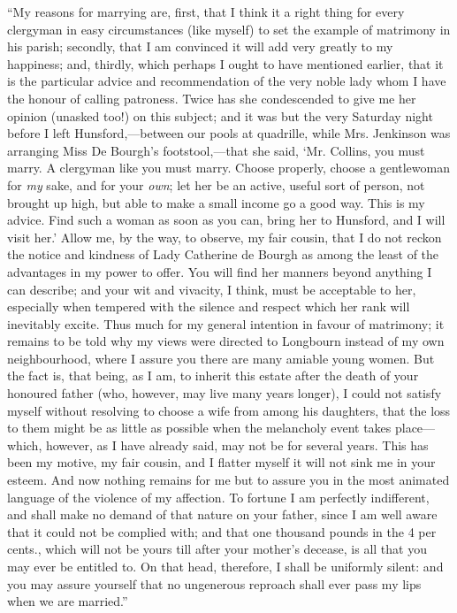 \documentclass[12pt,openright]{book}
\begin{document}
“My reasons for marrying are, first, that I think it a right thing for every clergyman in easy circumstances (like myself) to set the example of matrimony in his parish; secondly, that I am convinced it will add very greatly to my happiness; and, thirdly, which perhaps I ought to have mentioned earlier, that it is the particular advice and recommendation of the very noble lady whom I have the honour of calling patroness. Twice has she condescended to give me her opinion (unasked too!) on this subject; and it was but the very Saturday night before I left Hunsford,—between our pools at quadrille, while Mrs. Jenkinson was arranging Miss De Bourgh’s footstool,—that she said, ‘Mr. Collins, you must marry. A clergyman like you must marry. Choose properly, choose a gentlewoman for \textit{my} sake, and for your \textit{own}; let her be an active, useful sort of person, not brought up high, but able to make a small income go a good way. This is my advice. Find such a woman as soon as you can, bring her to Hunsford, and I will visit her.’ Allow me, by the way, to observe, my fair cousin, that I do not reckon the notice and kindness of Lady Catherine de Bourgh as among the least of the advantages in my power to offer. You will find her manners beyond anything I can describe; and your wit and vivacity, I think, must be acceptable to her, especially when tempered with the silence and respect which her rank will inevitably excite. Thus much for my general intention in favour of matrimony; it remains to be told why my views were directed to Longbourn instead of my own neighbourhood, where I assure you there are many amiable young women. But the fact is, that being, as I am, to inherit this estate after the death of your honoured father (who, however, may live many years longer), I could not satisfy myself without resolving to choose a wife from among his daughters, that the loss to them might be as little as possible when the melancholy event takes place—which, however, as I have already said, may not be for several years. This has been my motive, my fair cousin, and I flatter myself it will not sink me in your esteem. And now nothing remains for me but to assure you in the most animated language of the violence of my affection. To fortune I am perfectly indifferent, and shall make no demand of that nature on your father, since I am well aware that it could not be complied with; and that one thousand pounds in the 4 per cents., which will not be yours till after your mother’s decease, is all that you may ever be entitled to. On that head, therefore, I shall be uniformly silent: and you may assure yourself that no ungenerous reproach shall ever pass my lips when we are married.”
\end{document}
